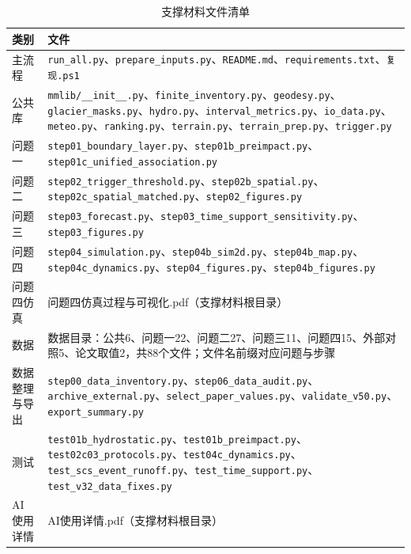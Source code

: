 \begin{table}[htbp]\centering\footnotesize
\caption{支撑材料文件清单}\label{tab:files}
\begin{tabularx}{\textwidth}{@{}>{\hsize}Y >{\hsize\centering\arraybackslash}X@{}}
\toprule
类别&文件\\
\midrule
主流程&\texttt{run\_all.py}、\texttt{prepare\_inputs.py}、\texttt{README.md}、\texttt{requirements.txt}、\texttt{复现.ps1}\\
公共库&\texttt{mmlib/\_\_init\_\_.py}、\texttt{finite\_inventory.py}、\texttt{geodesy.py}、\texttt{glacier\_masks.py}、\texttt{hydro.py}、\texttt{interval\_metrics.py}、\texttt{io\_data.py}、\texttt{meteo.py}、\texttt{ranking.py}、\texttt{terrain.py}、\texttt{terrain\_prep.py}、\texttt{trigger.py}\\
问题一&\texttt{step01\_boundary\_layer.py}、\texttt{step01b\_preimpact.py}、\texttt{step01c\_unified\_association.py}\\
问题二&\texttt{step02\_trigger\_threshold.py}、\texttt{step02b\_spatial.py}、\texttt{step02c\_spatial\_matched.py}、\texttt{step02\_figures.py}\\
问题三&\texttt{step03\_forecast.py}、\texttt{step03\_time\_support\_sensitivity.py}、\texttt{step03\_figures.py}\\
问题四&\texttt{step04\_simulation.py}、\texttt{step04b\_sim2d.py}、\texttt{step04b\_map.py}、\texttt{step04c\_dynamics.py}、\texttt{step04\_figures.py}、\texttt{step04b\_figures.py}\\
问题四仿真&问题四仿真过程与可视化.pdf（支撑材料根目录）\\
数据&数据目录：公共6、问题一22、问题二27、问题三11、问题四15、外部对照5、论文取值2，共88个文件；文件名前缀对应问题与步骤\\
数据整理与导出&\texttt{step00\_data\_inventory.py}、\texttt{step06\_data\_audit.py}、\texttt{archive\_external.py}、\texttt{select\_paper\_values.py}、\texttt{validate\_v50.py}、\texttt{export\_summary.py}\\
测试&\texttt{test01b\_hydrostatic.py}、\texttt{test01b\_preimpact.py}、\texttt{test02c03\_protocols.py}、\texttt{test04c\_dynamics.py}、\texttt{test\_scs\_event\_runoff.py}、\texttt{test\_time\_support.py}、\texttt{test\_v32\_data\_fixes.py}\\
AI 使用详情&AI使用详情.pdf（支撑材料根目录）\\
\bottomrule
\end{tabularx}\end{table}
